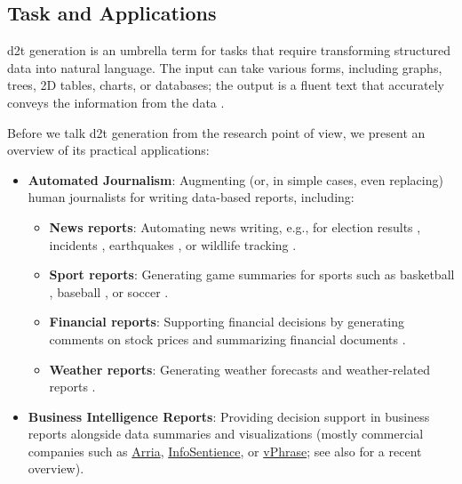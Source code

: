 {\subsection{Task and Applications}
\label{sec:d2t-tasks}

\ac{d2t} generation is an umbrella term for tasks that require transforming structured data into natural language. The input can take various forms, including graphs, trees, 2D tables, charts, or databases; the output is a fluent text that accurately conveys the information from the data \cite{gattSurveyStateArt2018,sharmaInnovationsNeuralDatatotext2022}.

Before we talk \ac{d2t} generation from the research point of view, we present an overview of its practical applications:

\begin{itemize}
    \item \textbf{Automated Journalism}: Augmenting (or, in simple cases, even replacing) human journalists for writing data-based reports, including:
          \begin{itemize}
              \item \textbf{News reports}: Automating news writing, e.g., for election results \cite{leppanen2017data}, incidents \cite{vanderleeCACAPODatasetMultilingual2020}, earthquakes \cite{oremus2014first}, or wildlife tracking \cite{siddharthan2012blogging,ponnamperuma2013tag2blog}.
              \item \textbf{Sport reports}: Generating game summaries for sports such as basketball \cite{wiseman2017challenges,thomson2020sportsett}, baseball \cite{puduppullyDatatotextGenerationEntity2019}, or soccer \cite{van2017pass}.
              \item \textbf{Financial reports}: Supporting financial decisions by generating comments on stock prices \cite{murakami2017learning,aoki2018generating} and summarizing financial documents \cite{chapman2022towards}.
              \item \textbf{Weather reports}: Generating weather forecasts and weather-related reports \cite{goldberg1994using,belz2005corpus,belz2008automatic,angeli-etal-2010-simple,balakrishnan2019constrained}.
          \end{itemize}
    \item \textbf{Business Intelligence Reports}: Providing decision support in business reports alongside data summaries and visualizations (mostly commercial companies such as \href{https://www.arria.com}{Arria}, \href{https://infosentience.com}{InfoSentience}, or \href{https://www.vphrase.com}{vPhrase}; see also \citet{daleNavigatingTextGeneration2023} for a recent overview).

\end{itemize}}
